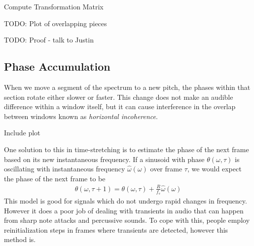 \documentclass[12pt]{article}
\begin{document}
\begin{algorithm}
  \caption{Compute Transformation Matrix}\label{transport}
\begin{algorithmic}
    \Else
    \EndIf
  \EndWhile
\end{algorithmic}
\end{algorithm}

TODO: Plot of overlapping pieces

TODO: Proof - talk to Justin


\newpage
\subsection{Phase Accumulation}

When we move a segment of the spectrum to a new pitch, 
the phases within that section rotate either slower or faster.
This change does not make an audible difference within a window itself,
but it can cause interference in the overlap between windows known as \emph{horizontal incoherence}.

Include plot

One solution to this in time-stretching is to estimate the phase of the next frame based on its new instantaneous frequency. 
If a sinusoid with phase $\theta(\omega, \tau)$ 
is oscillating with instantaneous frequency $\hat{\omega}(\omega)$ over frame $\tau$, we would expect the phase of the next frame to be
\begin{align}
  \theta(\omega, \tau+1) = 
  \theta(\omega,\tau) + \frac{R}{f_s}\hat{\omega}(\omega)
\end{align}
This model is good for signals which do not undergo rapid changes in frequency. 
However it does a poor job of dealing with transients in audio that can happen from sharp note attacks and percussive sounds. 
To cope with this, people employ reinitialization steps in frames where transients are detected, however this method is.
\end{document}
